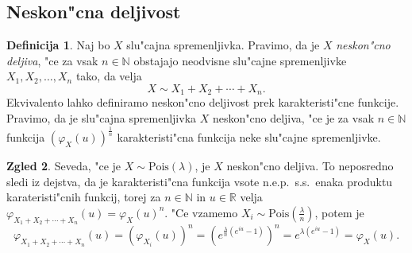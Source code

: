 \documentclass[12pt, a4paper, reqno]{amsart}
\theoremstyle{definition}
\newtheorem{definicija}{Definicija}[section]
\newtheorem{zgled}[definicija]{Zgled}
\theoremstyle{plain}
\newcommand{\R}{\mathbb{R}}
\newcommand{\N}{\mathbb{N}}
\newcommand{\E}{\mathbb{E}}
\newcommand{\F}{\mathcal{F}}
\newcommand{\1}{\mathds{1}}
\begin{document}
%
%

    \subsection{Neskon"cna deljivost}

    \begin{definicija}
        Naj bo $X$ slu"cajna spremenljivka. Pravimo, da je $X$ \textit{neskon"cno deljiva}, "ce za vsak $n\in\N$
        obstajajo neodvisne slu"cajne spremenljivke $X_1, X_2, \dots, X_n$ tako, da velja
        \begin{equation*}
            X \sim X_1 + X_2 + \cdots + X_n.
        \end{equation*}
        Ekvivalento lahko definiramo neskon"cno deljivost prek karakteristi"cne funkcije. Pravimo, da je
        slu"cajna spremenljivka $X$ neskon"cno deljiva, "ce je za vsak $n\in\N$ funkcija 
        $\left(\varphi_X(u)\right)^{\frac{1}{n}}$ karakteristi"cna funkcija neke slu"cajne spremenljivke.
    \end{definicija}

    \begin{zgled}
        Seveda, "ce je $X\sim \text{Pois}(\lambda)$, je $X$ neskon"cno deljiva. To neposredno sledi 
        iz dejstva, da je karakteristi"cna funkcija vsote n.e.p.\ s.s.\ enaka produktu karateristi"cnih 
        funkcij, torej za $n\in\N$ in $u\in\R$ velja $\varphi_{X_1 + X_2 + \cdots + X_n}(u) = \varphi_X(u)^n$. 
        "Ce vzamemo $X_i \sim \text{Pois}(\tfrac{\lambda}{n})$, potem je 
        \begin{equation*}
        \varphi_{X_1 + X_2 + \cdots + X_n}(u) = 
        \left(\varphi_{X_i}(u)\right)^n = \left(e^{\tfrac{\lambda}{n}(e^{iu} - 1)}\right)^n = e^{\lambda(e^{iu} - 1)} = \varphi_X(u).
        \end{equation*}
    \end{zgled}
\end{document}

